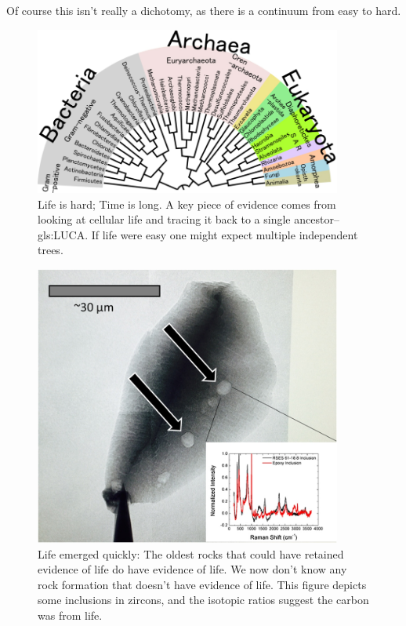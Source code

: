 \documentclass[]{article}
\begin{document}
Of course this isn't really a dichotomy, as there is a continuum from easy to hard.

\begin{figure}[H]
	\caption[Life is hard.]{Life is hard; Time is long. A key piece of evidence comes from looking at cellular life and tracing it back to a single ancestor--\gls{gls:LUCA}. If life were easy one might expect multiple independent trees.}\label{fig:luca} 
	\includegraphics[width=0.9\textwidth]{Luca}
\end{figure}

\begin{figure}[H]
	\caption[Life emerged quickly]{Life emerged quickly: The oldest rocks that could have retained evidence of life do have evidence of life. We now don't know any rock formation that doesn't have evidence of life. This figure depicts some inclusions in zircons\cite{bell2015potentially}, and the isotopic ratios suggest the carbon was from life.}\label{fig:zircons} 
	\includegraphics[width=0.9\textwidth]{Zircons}
\end{figure}
\end{document}

